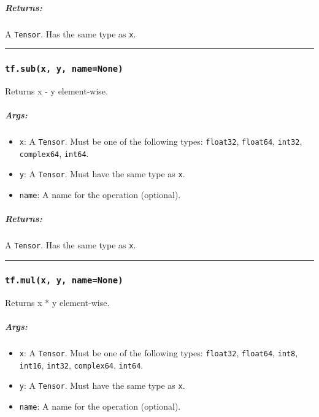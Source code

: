 \subparagraph{Returns: }\label{returns}

A \texttt{Tensor}. Has the same type as \texttt{x}.

\begin{center}\rule{0.5\linewidth}{\linethickness}\end{center}

\subsubsection{\texorpdfstring{\texttt{tf.sub(x,\ y,\ name=None)}
}{tf.sub(x, y, name=None) }}\label{tf.subx-y-namenone}

Returns x - y element-wise.

\subparagraph{Args: }\label{args-1}

\begin{itemize}
\tightlist
\item
  \texttt{x}: A \texttt{Tensor}. Must be one of the following types:
  \texttt{float32}, \texttt{float64}, \texttt{int32},
  \texttt{complex64}, \texttt{int64}.
\item
  \texttt{y}: A \texttt{Tensor}. Must have the same type as \texttt{x}.
\item
  \texttt{name}: A name for the operation (optional).
\end{itemize}

\subparagraph{Returns: }\label{returns-1}

A \texttt{Tensor}. Has the same type as \texttt{x}.

\begin{center}\rule{0.5\linewidth}{\linethickness}\end{center}

\subsubsection{\texorpdfstring{\texttt{tf.mul(x,\ y,\ name=None)}
}{tf.mul(x, y, name=None) }}\label{tf.mulx-y-namenone}

Returns x * y element-wise.

\subparagraph{Args: }\label{args-2}

\begin{itemize}
\tightlist
\item
  \texttt{x}: A \texttt{Tensor}. Must be one of the following types:
  \texttt{float32}, \texttt{float64}, \texttt{int8}, \texttt{int16},
  \texttt{int32}, \texttt{complex64}, \texttt{int64}.
\item
  \texttt{y}: A \texttt{Tensor}. Must have the same type as \texttt{x}.
\item
  \texttt{name}: A name for the operation (optional).
\end{itemize}

